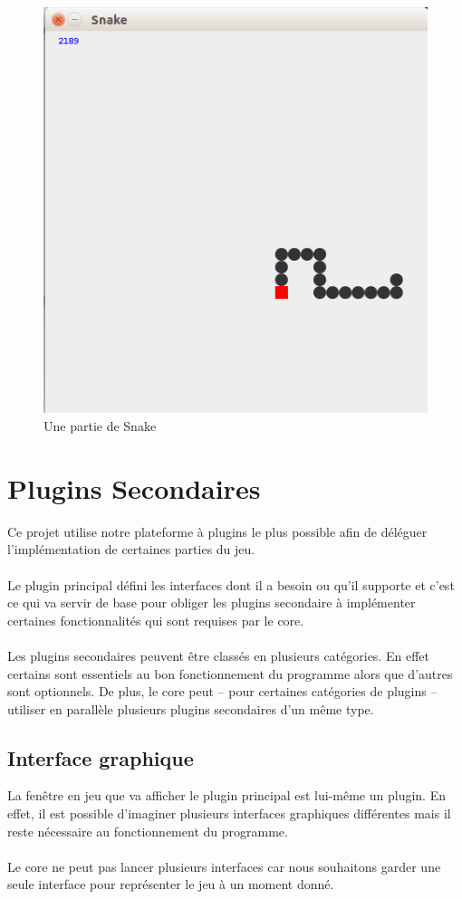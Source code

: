 \documentclass[12pt,a4paper]{article}
\begin{document}
\begin{figure}[h]
    \centering
    \includegraphics[scale=0.4]{ressources/snake.png}
    \caption{Une partie de Snake}
\end{figure}   
    
\section{Plugins Secondaires}    
Ce projet utilise notre plateforme à plugins le plus possible afin de déléguer 
l'implémentation de certaines parties du jeu. 
\\\\
Le plugin principal défini les interfaces dont il a besoin ou qu'il supporte et c'est 
ce qui va servir de base pour obliger les plugins secondaire à implémenter
certaines fonctionnalités qui sont requises par le core. 
\\\\
Les plugins secondaires peuvent être classés en plusieurs catégories. En effet 
certains sont essentiels au bon fonctionnement du programme alors que d'autres 
sont optionnels. De plus, le core peut -- pour certaines catégories de plugins -- 
utiliser en parallèle plusieurs plugins secondaires d'un même type. 
    
\subsection{Interface graphique}
La fenêtre en jeu que va afficher le plugin principal est lui-même un plugin. 
En effet, il est possible d'imaginer plusieurs interfaces graphiques différentes mais
il reste nécessaire au fonctionnement du programme. 
\\\\
Le core ne peut pas lancer plusieurs interfaces car nous souhaitons garder
une seule interface pour représenter le jeu à un moment donné.
    
\end{document}
